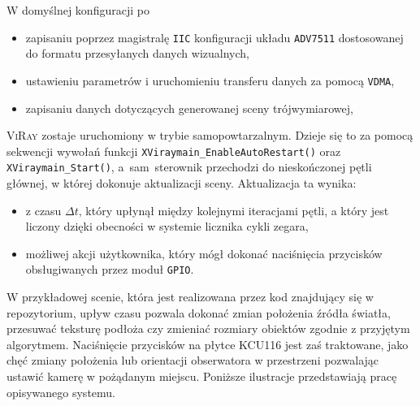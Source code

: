 W domyślnej konfiguracji po
\begin{itemize}
\item zapisaniu poprzez magistralę \texttt{IIC} konfiguracji układu \texttt{ADV7511} dostosowanej do formatu przesyłanych danych wizualnych,
\item ustawieniu parametrów i uruchomieniu transferu danych za pomocą \texttt{VDMA},
\item zapisaniu danych dotyczących generowanej sceny trójwymiarowej,
\end{itemize}
\textsc{ViRay} zostaje uruchomiony w trybie samopowtarzalnym. Dzieje się to za pomocą sekwencji wywołań funkcji \texttt{XViraymain\_EnableAutoRestart()} oraz \texttt{XViraymain\_Start()}, a~sam~sterownik przechodzi do nieskończonej pętli głównej, w której dokonuje aktualizacji sceny. Aktualizacja ta wynika:
\begin{itemize}
\item z czasu $\Delta t$, który upłynął między kolejnymi iteracjami pętli, a który jest liczony dzięki obecności w systemie licznika cykli zegara,
\item możliwej akcji użytkownika, który mógł dokonać naciśnięcia przycisków obsługiwanych przez moduł \texttt{GPIO}.
\end{itemize}

W przykładowej scenie, która jest realizowana przez kod znajdujący się w repozytorium, upływ czasu pozwala dokonać zmian położenia źródła światła, przesuwać teksturę podłoża czy zmieniać rozmiary obiektów zgodnie z przyjętym algorytmem. Naciśnięcie przycisków na płytce KCU116 jest zaś traktowane, jako chęć zmiany położenia lub orientacji obserwatora w przestrzeni pozwalając ustawić kamerę w pożądanym miejscu. Poniższe ilustracje przedstawiają pracę opisywanego systemu.

